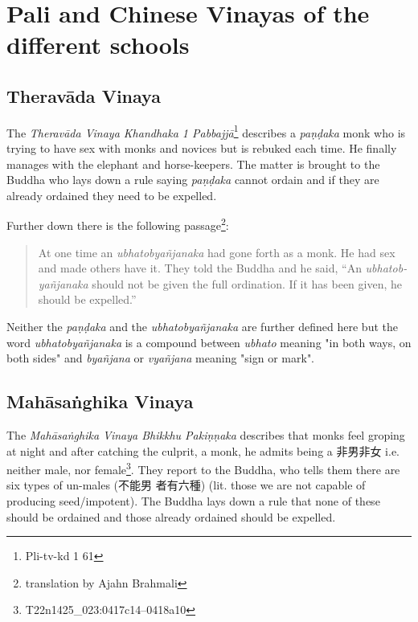 \section{Pali and Chinese Vinayas of the different schools}

\subsection{Theravāda Vinaya}
The {\em Theravāda Vinaya Khandhaka 1 Pabbajjā}\footnote{Pli-tv-kd 1 61} describes a {\em paṇḍaka} monk who is trying to have sex with monks and novices but is rebuked each time. He finally manages with the elephant and horse-keepers. The matter is brought to the Buddha who lays down a rule saying {\em paṇḍaka} cannot ordain and if they are already ordained they need to be expelled.

Further down there is the following passage\footnote{translation by Ajahn Brahmali}:

\begin{quote}
At one time an {\em ubhatob­yañ­janaka} had gone forth as a monk. He had sex and made others have it. They told the Buddha and he said, “An {\em ubhatob­yañ­janaka} should not be given the full ordination. If it has been given, he should be expelled.”
\end{quote}

Neither the {\em paṇḍaka} and the {\em ubhatob­yañ­janaka} are further defined here but the word {\em ubhatob­yañ­janaka} is a compound between {\em ubhato} meaning "in both ways, on both sides" and {\em byañjana} or {\em vyañjana} meaning "sign or mark".


\subsection{Mahāsaṅghika Vinaya}
The {\em Mahāsaṅghika Vinaya Bhikkhu Pakiṇṇaka} describes that monks feel groping at night and after catching the culprit, a monk, he admits being a 非男非女 i.e. neither male, nor female\footnote{T22n1425_023:0417c14–0418a10}. They report to the Buddha, who tells them there are six types of un-males (不能男 者有六種) (lit. those we are not capable of producing seed/impotent). The Buddha lays down a rule that none of these should be ordained and those already ordained should be expelled.


